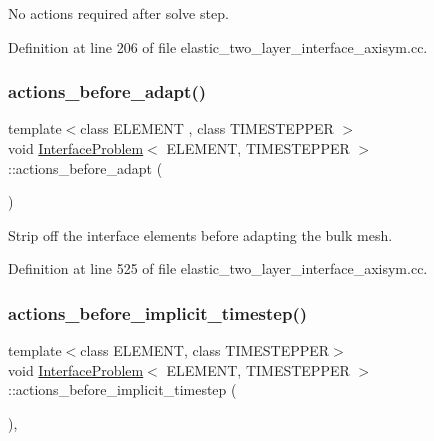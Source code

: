 No actions required after solve step. 



Definition at line 206 of file elastic\+\_\+two\+\_\+layer\+\_\+interface\+\_\+axisym.\+cc.

\mbox{\label{classInterfaceProblem_a944e5754e9b3f3394211b6c62f705abe}} 
\subsubsection{\texorpdfstring{actions\+\_\+before\+\_\+adapt()}{actions\_before\_adapt()}}
{\footnotesize\ttfamily template$<$class E\+L\+E\+M\+E\+NT , class T\+I\+M\+E\+S\+T\+E\+P\+P\+ER $>$ \\
void \hyperlink{classInterfaceProblem}{Interface\+Problem}$<$ E\+L\+E\+M\+E\+NT, T\+I\+M\+E\+S\+T\+E\+P\+P\+ER $>$\+::actions\+\_\+before\+\_\+adapt (\begin{DoxyParamCaption}{ }\end{DoxyParamCaption})\hspace{0.3cm}{\ttfamily [private]}}



Strip off the interface elements before adapting the bulk mesh. 



Definition at line 525 of file elastic\+\_\+two\+\_\+layer\+\_\+interface\+\_\+axisym.\+cc.

\mbox{\label{classInterfaceProblem_ae3ec75fcc8ccca97207dc7eca23b1cce}} 
\subsubsection{\texorpdfstring{actions\+\_\+before\+\_\+implicit\+\_\+timestep()}{actions\_before\_implicit\_timestep()}}
{\footnotesize\ttfamily template$<$class E\+L\+E\+M\+E\+NT, class T\+I\+M\+E\+S\+T\+E\+P\+P\+ER$>$ \\
void \hyperlink{classInterfaceProblem}{Interface\+Problem}$<$ E\+L\+E\+M\+E\+NT, T\+I\+M\+E\+S\+T\+E\+P\+P\+ER $>$\+::actions\+\_\+before\+\_\+implicit\+\_\+timestep (\begin{DoxyParamCaption}{ }\end{DoxyParamCaption})\hspace{0.3cm}{\ttfamily [inline]}, {\ttfamily [private]}}



